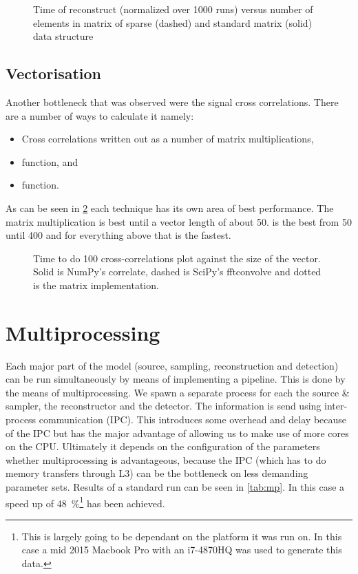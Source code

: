 \documentclass[a4paper, openany, oneside]{memoir}
\begin{document}
\begin{figure}[]
    \centering
    
    \caption{Time of reconstruct (normalized over 1000 runs) versus number of elements in matrix of sparse (dashed) and standard matrix (solid) data structure}
    \label{fig:sparse}
\end{figure}

\subsection{Vectorisation}
\label{sec:vectorisation}
Another bottleneck that was observed were the signal cross correlations. There are a number of ways to calculate it namely:
\begin{itemize}
    \item Cross correlations written out as a number of matrix multiplications,
    \item {}  function, and
    \item {}  function.
\end{itemize}
As can be seen in \cref{fig:correlation} each technique has its own area of best performance. The matrix multiplication is best until a vector length of about 50.   is the best from 50 until 400 and for everything above that  is the fastest.

\begin{figure}[]
    \centering
    
    \caption{Time to do 100 cross-correlations plot against the size of the vector. Solid is NumPy's correlate, dashed is SciPy's fftconvolve and dotted is the matrix implementation.}
    \label{fig:correlation}
\end{figure}

\section{Multiprocessing}
\label{sec:multiprocessing}

Each major part of the model (source, sampling, reconstruction and detection) can be run simultaneously by means of implementing a pipeline. This is done by the means of multiprocessing. We spawn a separate process for each the source \& sampler, the reconstructor and the detector. The information is send using inter-process communication (IPC). This introduces some overhead and delay because of the IPC but has the major advantage of allowing us to make use of more cores on the CPU. Ultimately it depends on the configuration of the parameters whether multiprocessing is advantageous, because the IPC (which has to do memory transfers through L3) can be the bottleneck on less demanding parameter sets. Results of a standard run can be seen in \cref{tab:mp}. In this case a speed up of \SI{48}{\percent}\footnote{This is largely going to be dependant on the platform it was run on. In this case a mid 2015 Macbook Pro with an i7-4870HQ was used to generate this data.} has been achieved.
\end{document}
